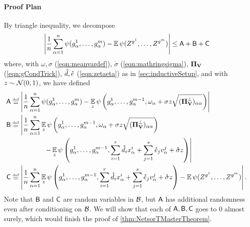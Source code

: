 \documentclass[main.tex]{subfiles}
\begin{document}
\paragraph{Proof Plan}
By triangle inequality, we decompose
\begin{align}
        \left|\f 1 n \sum_{\alpha = 1}^n \psi(g^1_\alpha, \ldots, g^{\MM}_\alpha)
        - \EV \psi(\Zz^{g^1}, \ldots, \Zz^{g^\MM})
        \right|
    \le
        \probA + \probB + \probC
        \label{eqn:decompABC}
\end{align}
where, with $\omega, \sigma$ (\cref{eqn:meanvardef}), $\mathring \sigma$ (\cref{eqn:mathringsigma}), $\boldsymbol{\Pi}_{\mathbf{V}}$ (\cref{eqn:gCondTrick}), $\mathring {d}, \mathring{e}$ (\cref{eqn:zetaeta}) as in \cref{sec:inductiveSetup}, and with $z  \sim \mathcal{N}(0, 1)$, we have defined
\begin{align*}
    \probA
        &\defeq
            \left|\f 1 n \sum_{\alpha = 1}^n \psi(g^1_\alpha, \ldots, g^{\MM}_\alpha)
            - \EV_z\psi\left(g^1_\alpha, \ldots, g^{\MM-1}_\alpha, \omega_\alpha + \sigma z \sqrt{(\PP^\perp_{\Vme})_{\alpha\alpha}}\right)\right|
            \\
    \probB
        &\defeq
            \left|
            \f 1 n \sum_{\alpha = 1}^n \EV_z\psi\left(g^1_\alpha, \ldots, g^{\MM-1}_\alpha, \omega_\alpha + \sigma z \sqrt{(\PP^\perp_{\Vme})_{\alpha\alpha}}\right)
            \right.
            \\
          &\phantomeq
            \phantom{\f 1 n \sum_{\alpha = 1}^n}\quad
            \left.
            -
            \EV_z
                {
                    \psi\lp
                        g^1_\alpha, \ldots, g^{\MM-1}_\alpha,
                        \sum_{i=1}^r \mathring {\dme}_i \xme^i_\alpha +
                        \sum_{j=1}^s \mathring {\eme}_j \vme^j_\alpha + \mathring \sigma z
                        \rp
                }
            \right|
            \\
    \probC
        &\defeq
            \left|
            \f 1 n \sum_{\alpha = 1}^n
            \EV_z
                {
                    \psi\lp
                        g^1_\alpha, \ldots, g^{\MM-1}_\alpha,
                        \sum_{i=1}^r \mathring {\dme}_i \xme^i_\alpha +
                        \sum_{j=1}^s \mathring {\eme}_j \vme^j_\alpha + \mathring \sigma z
                        \rp
                }
            -
            \EV \psi(\Zz^{g^1}, \ldots, \Zz^{g^\MM})
            \right|
            .
\end{align*}
Note that $\mathsf{B}$ and $\mathsf{C}$ are random variables in $\mathcal{B}$, but $\mathsf{A}$ has additional randomness even after conditioning on $\mathcal{B}$.
We will show that each of $\mathsf{A}, \mathsf{B}, \mathsf{C}$ goes to 0 almost surely, which would finish the proof of \cref{thm:NetsorTMasterTheorem}.
\end{document}
